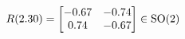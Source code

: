 \documentclass[preview]{standalone}
\begin{document}
\begin{align*}
\special{dvisvgm:raw <g id='unique000'>}R(2.30) = \begin{bmatrix} -0.67 & -0.74 \\ 0.74 & -0.67 \end{bmatrix} \in \text{SO}(2)\special{dvisvgm:raw </g>}
\end{align*}
\end{document}

